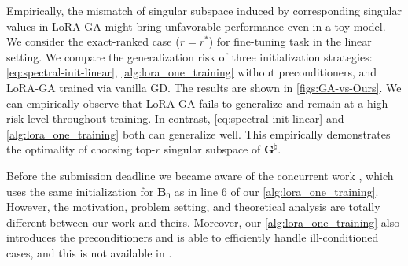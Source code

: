 Empirically, the mismatch of singular subspace induced by corresponding singular values in LoRA-GA might bring unfavorable performance even in a toy model. We consider the exact-ranked case ($r=r^*$) for fine-tuning task in the linear setting. 
We compare the generalization risk of three initialization strategies: \eqref{eq:spectral-init-linear}, \cref{alg:lora_one_training} without preconditioners, and LoRA-GA trained via vanilla GD. The results are shown in \cref{figs:GA-vs-Ours}. We can empirically observe that LoRA-GA fails to generalize and remain at a high-risk level throughout training. In contrast, \eqref{eq:spectral-init-linear} and \cref{alg:lora_one_training} both can generalize well. This empirically demonstrates the optimality of choosing top-$r$ singular subspace of $\bm G^\natural$.

Before the submission deadline we became aware of the concurrent work \cite{ponkshe2024initialization}, which uses the same initialization for $\bm B_0$ as in line 6 of our \cref{alg:lora_one_training}. However, the motivation, problem setting, and theoretical analysis are totally different between our work and theirs. Moreover, our \cref{alg:lora_one_training} also introduces the preconditioners and is able to efficiently handle ill-conditioned cases, and this is not available in \cite{ponkshe2024initialization}.